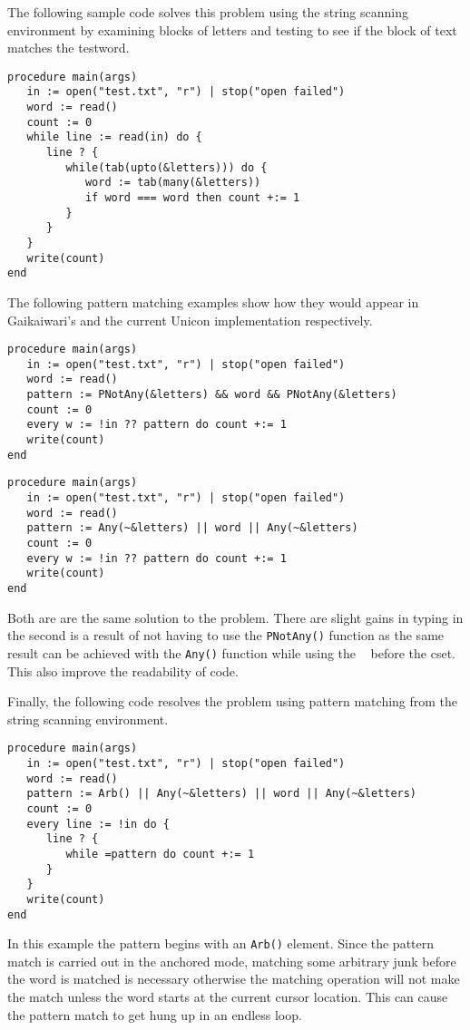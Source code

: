 \documentclass{article}
\begin{document}
The following sample code solves this problem using the string scanning environment by examining blocks of letters and testing to see if the block of text matches the testword.
\begin{verbatim}
procedure main(args)
   in := open("test.txt", "r") | stop("open failed")
   word := read()
   count := 0
   while line := read(in) do {
      line ? {
         while(tab(upto(&letters))) do {
            word := tab(many(&letters))
            if word === word then count +:= 1
         }
      }
   }
   write(count)
end
\end{verbatim}

The following pattern matching examples show how they would appear in Gaikaiwari's and the current Unicon implementation respectively.
\begin{verbatim}
procedure main(args)
   in := open("test.txt", "r") | stop("open failed")
   word := read()
   pattern := PNotAny(&letters) && word && PNotAny(&letters)
   count := 0
   every w := !in ?? pattern do count +:= 1
   write(count)
end
\end{verbatim}

\begin{verbatim}
procedure main(args)
   in := open("test.txt", "r") | stop("open failed")
   word := read()
   pattern := Any(~&letters) || word || Any(~&letters)
   count := 0
   every w := !in ?? pattern do count +:= 1
   write(count)
end
\end{verbatim}
Both are are the same solution to the problem.  There are slight gains in typing in the second is a result of not having to use the \texttt{PNotAny()} function as the same result can be achieved with the \texttt{Any()} function while using the \texttt{~} before the cset.  This also improve the readability of code.

Finally, the following code resolves the problem using pattern matching from the string scanning environment.
\begin{verbatim}
procedure main(args)
   in := open("test.txt", "r") | stop("open failed")
   word := read()
   pattern := Arb() || Any(~&letters) || word || Any(~&letters)
   count := 0
   every line := !in do {
      line ? {
         while =pattern do count +:= 1
      }
   }
   write(count)
end
\end{verbatim}
In this example the pattern begins with an \texttt{Arb()} element.  Since the pattern match is carried out in the anchored mode, matching some arbitrary junk before the word is matched is necessary otherwise the matching operation will not make the match unless the word starts at the current cursor location.  This can cause the pattern match to get hung up in an endless loop.
\end{document}
